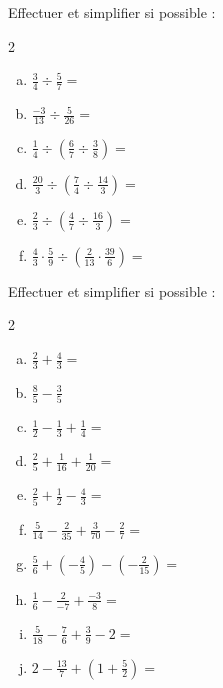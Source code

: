 \documentclass[twoside, a4paper, 12pt, openright, fullpage]{book}
\begin{document}
\begin{exercice}\label{fraction2}
Effectuer et simplifier si possible :
\begin{multicols}{2}
\begin{enumerate}[a)]
    \item $\displaystyle \frac{3}{4} \div \frac{5}{7} = $
    \item $\displaystyle \frac{-3}{13} \div \frac{5}{26} = $
    \item $\displaystyle \frac{1}{4}\div \left( \frac{6}{7} \div \frac{3}{8}\right) = $
    \item $\displaystyle \frac{20}{3} \div \left(\frac{7}{4}\div \frac{14}{3}\right) = $
    \item $\displaystyle \frac{2}{3} \div \left( \frac{4}{7} \div \frac{16}{3}\right) = $
    \item $\displaystyle \frac{4}{3}\cdot \frac{5}{9} \div \left(\frac{2}{13} \cdot \frac{39}{6}\right) = $
\end{enumerate}
\end{multicols}
\end{exercice}

\begin{exercice}\label{fraction3}
Effectuer et simplifier si possible :
\begin{multicols}{2}
\begin{enumerate}[a)]
    \item $\displaystyle \frac{2}{3}+\frac{4}{3}=$
    \item $\displaystyle \frac{8}{5}-\frac{3}{5}$
    \item $\displaystyle\frac{1}{2}-\frac{1}{3}+\frac{1}{4}=$
    \item $\displaystyle\frac{2}{5}+\frac{1}{16}+\frac{1}{20}=$
    \item $\displaystyle \frac{2}{5}+\frac{1}{2}-\frac{4}{3}=$
    \item $\displaystyle \frac{5}{14}-\frac{2}{35}+\frac{3}{70}-\frac{2}{7}=$
    \item $\displaystyle\frac{5}{6}+\left(-\frac{4}{5}\right) - \left(-\frac{2}{15}\right)=$
    \item $\displaystyle\frac{1}{6}-\frac{2}{-7}+\frac{-3}{8}=$
    \item $\displaystyle \frac{5}{18}-\frac{7}{6}+\frac{3}{9}-2=$
    \item $\displaystyle 2-\frac{13}{7}+\left(1+\frac{5}{2}\right)=$
    \end{enumerate}
\end{multicols}
\end{exercice}
\end{document}
